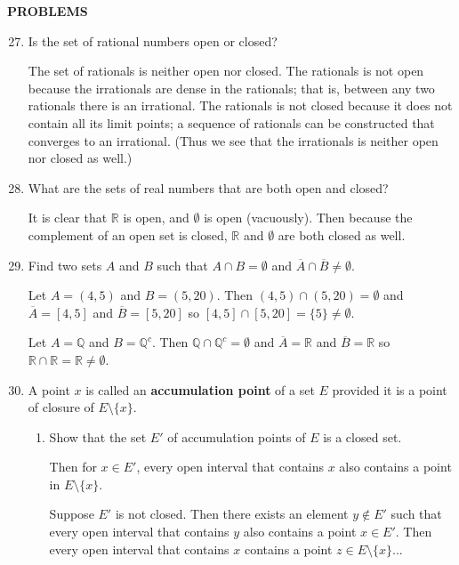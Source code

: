 \documentclass[a4paper,10pt]{book}
\theoremstyle{plain} %
\begin{document}
\begin{center}
	\textbf{PROBLEMS}
\end{center}
\begin{enumerate}
	\setcounter{enumi}{26}
	\item Is the set of rational numbers open or closed?\par
	The set of rationals is neither open nor closed.
	The rationals is not open because the irrationals are dense in the rationals; that is, between any two rationals there is an irrational.
	The rationals is not closed because it does not contain all its limit points; a sequence of rationals can be constructed that converges to an irrational.
	(Thus we see that the irrationals is neither open nor closed as well.)
	\item What are the sets of real numbers that are both open and closed?\par
	It is clear that $\mathbb{R}$ is open, and $\emptyset$ is open (vacuously).
	Then because the complement of an open set is closed, $\mathbb{R}$ and $\emptyset$ are both closed as well.
	\item Find two sets $A$ and $B$ such that $A \cap B = \emptyset$ and $\overline A \cap \overline B \neq \emptyset.$\par
	Let $A= (4,5)$ and $B = (5,20)$. Then $(4,5) \cap (5,20) = \emptyset$ and $\overline A= [4,5]$ and $\overline B = [5,20]$ so $[4,5] \cap [5,20]= \{5\} \neq \emptyset$.\par
	Let $A= \mathbb{Q}$ and $B = \mathbb{Q}^c$. Then $\mathbb{Q} \cap \mathbb{Q}^c = \emptyset$ and $\overline A= \mathbb{R}$ and $\overline B = \mathbb{R}$ so $\mathbb{R} \cap \mathbb{R}= \mathbb{R} \neq \emptyset$.\par
	\item A point $x$ is called an \textbf{accumulation point} of a set $E$ provided it is a point of closure of $E \setminus \{ x\}.$
	\begin{enumerate}[label=(\roman*),align=left]
        \item Show that the set $E'$ of accumulation points of $E$ is a closed set.\par
        Then for $x \in E'$, every open interval that contains $x$ also contains a point in $E \setminus \{x\}$.\par
		Suppose $E'$ is not closed. 
		Then there exists an element $y \notin E'$ such that every open interval that contains $y$ also contains a point $x \in E'$.
		Then every open interval that contains $x$ contains a point $z \in E \setminus \{x\}$... 

\end{enumerate}
\end{enumerate}
\end{document}
